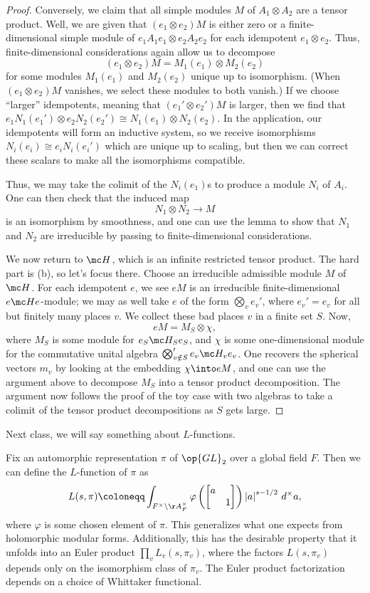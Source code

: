\documentclass[../notes.tex]{subfiles}
\begin{document}
\begin{proof}
	Conversely, we claim that all simple modules $M$ of $A_1\otimes A_2$ are a tensor product. Well, we are given that $(e_1\otimes e_2)M$ is either zero or a finite-dimensional simple module of $e_1A_1e_1\otimes e_2A_2e_2$ for each idempotent $e_1\otimes e_2$. Thus, finite-dimensional considerations again allow us to decompose
	\[(e_1\otimes e_2)M=M_1(e_1)\otimes M_2(e_2)\]
	for some modules $M_1(e_1)$ and $M_2(e_2)$ unique up to isomorphism. (When $(e_1\otimes e_2)M$ vanishes, we select these modules to both vanish.) If we choose ``larger'' idempotents, meaning that $(e_1'\otimes e_2')M$ is larger, then we find that $e_1N_1(e_1')\otimes e_2N_2(e_2')\cong N_1(e_1)\otimes N_2(e_2)$. In the application, our idempotents will form an inductive system, so we receive isomorphisms $N_i(e_i)\cong e_iN_i(e_i')$ which are unique up to scaling, but then we can correct these scalars to make all the isomorphisms compatible.

	Thus, we may take the colimit of the $N_i(e_1)$s to produce a module $N_i$ of $A_i$. One can then check that the induced map
	\[N_1\otimes N_2\to M\]
	is an isomorphism by smoothness, and one can use the lemma to show that $N_1$ and $N_2$ are irreducible by passing to finite-dimensional considerations.

	We now return to $\mc H$, which is an infinite restricted tensor product. The hard part is (b), so let's focus there. Choose an irreducible admissible module $M$ of $\mc H$. For each idempotent $e$, we see $eM$ is an irreducible finite-dimensional $e\mc He$-module; we may as well take $e$ of the form $\bigotimes_ve_v'$, where $e_v'=e_v$ for all but finitely many places $v$. We collect these bad places $v$ in a finite set $S$. Now,
	\[eM=M_S\otimes\chi,\]
	where $M_S$ is some module for $e_S\mc H_Se_S$, and $\chi$ is some one-dimensional module for the commutative unital algebra $\bigotimes'_{v\notin S}e_v\mc H_ve_v$. One recovers the spherical vectors $m_v$ by looking at the embedding $\chi\into eM$, and one can use the argument above to decompose $M_S$ into a tensor product decomposition. The argument now follows the proof of the toy case with two algebras to take a colimit of the tensor product decompositions as $S$ gets large.
\end{proof}
Next class, we will say something about $L$-functions.
\begin{example}
	Fix an automorphic representation $\pi$ of $\op{GL}_{2}$ over a global field $F$. Then we can define the $L$-function of $\pi$ as
	\[L(s,\pi)\coloneqq\int_{F^\times\backslash\AA_F^\times}\varphi\left(\begin{bmatrix}
		a \\ & 1
	\end{bmatrix}\right)\left|a\right|^{s-1/2}\,d^\times a,\]
	where $\varphi$ is some chosen element of $\pi$. This generalizes what one expects from holomorphic modular forms. Additionally, this has the desirable property that it unfolds into an Euler product $\prod_vL_v(s,\pi_v)$, where the factors $L(s,\pi_v)$ depends only on the isomorphism class of $\pi_v$. The Euler product factorization depends on a choice of Whittaker functional.
\end{example}
\end{document}
